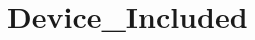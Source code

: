 \hypertarget{group___device___included}{}\section{Device\+\_\+\+Included}
\label{group___device___included}
